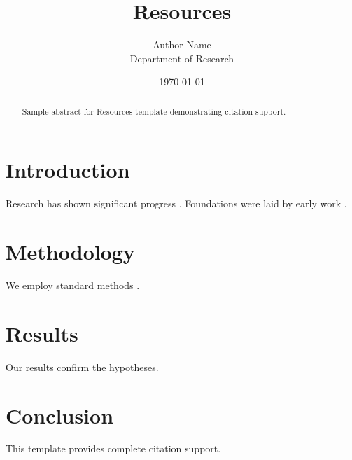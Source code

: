 \documentclass{mdpi}
\title{Resources}
\author{Author Name \\ \small Department of Research}
\date{\today}
\begin{document}
\maketitle

\begin{abstract}
Sample abstract for Resources template demonstrating citation support.
\end{abstract}

\section{Introduction}
Research has shown significant progress \citep{einstein1905}. Foundations were laid by early work \citep{turing1950}.

\section{Methodology}
We employ standard methods \citep{knuth1984}.

\section{Results}
Our results confirm the hypotheses.

\section{Conclusion}
This template provides complete citation support.



\end{document}

